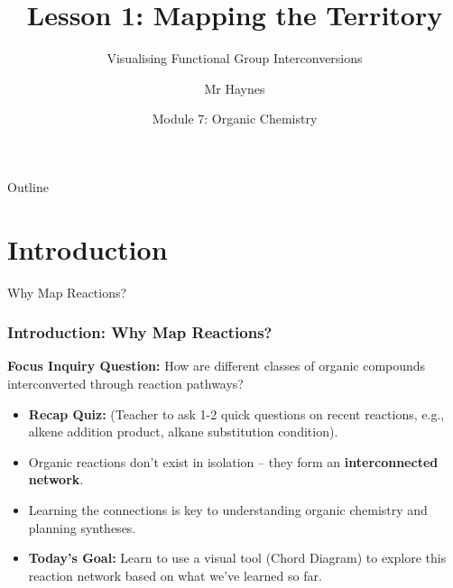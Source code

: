 \documentclass[xcolor=svgnames]{beamer}
\title[Org Chem: Mapping Reactions]{Lesson 1: Mapping the Territory}
\subtitle{Visualising Functional Group Interconversions}
\author[P. Haynes]{Mr Haynes} %
\institute[GHS]{Gosford High School}
\date{Module 7: Organic Chemistry}
\begin{document}
\begin{frame}
    \titlepage
\end{frame}

\begin{frame}{Outline}
    \tableofcontents
\end{frame}

\section{Introduction}
\begin{frame}{Why Map Reactions?}
    \frametitle{Introduction: Why Map Reactions?}
    \textbf{Focus Inquiry Question:} How are different classes of organic compounds interconverted through reaction pathways?
    \vspace{1em}

    \begin{itemize}
        \item \textbf{Recap Quiz:} (Teacher to ask 1-2 quick questions on recent reactions, e.g., alkene addition product, alkane substitution condition).
        \item Organic reactions don't exist in isolation – they form an \textbf{interconnected network}.
        \item Learning the connections is key to understanding organic chemistry and planning syntheses.
        \item \textbf{Today's Goal:} Learn to use a visual tool (Chord Diagram) to explore this reaction network based on what we've learned so far.
    \end{itemize}
\end{frame}
\end{document}
